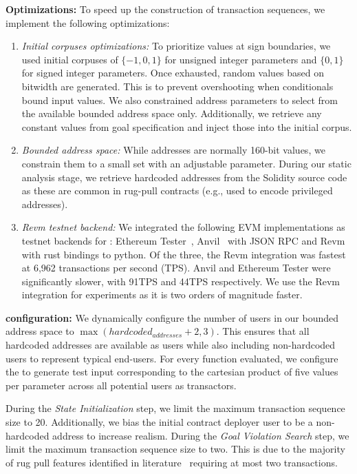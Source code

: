 \smallskip
\noindent
\textbf{Optimizations:} To speed up the construction of transaction sequences, we implement the following optimizations:
\begin{enumerate}
    \item \textit{Initial corpuses optimizations:}
        To prioritize values at sign boundaries, we used initial corpuses of $\{-1, 0, 1\}$ for unsigned integer parameters and $\{0, 1\}$ for signed integer parameters.
        Once exhausted, random values based on bitwidth are generated.
        This is to prevent overshooting when conditionals bound input values.
        We also constrained address parameters to select from the available bounded address space only.
        Additionally, we retrieve any constant values from goal specification and inject those into the initial corpus.
    \item \textit{Bounded address space:}
        While addresses are normally 160-bit values, we constrain them to a small set with an adjustable parameter.
        During our static analysis stage, we retrieve hardcoded addresses from the Solidity source code as these are common in rug-pull contracts (e.g., used to encode privileged addresses).
    \item \textit{Revm testnet backend:}
        We integrated the following EVM implementations as testnet backends for \spoilsport: Ethereum Tester~\cite{ethereum_tester}, Anvil~\cite{anvil} with JSON RPC and Revm~\cite{revm} with rust bindings to python.
        Of the three, the Revm integration was fastest at 6,962 transactions per second (TPS).
        Anvil and Ethereum Tester were significantly slower, with 91TPS and 44TPS respectively.
        We use the Revm integration for experiments as it is two orders of magnitude faster.
\end{enumerate}

\smallskip
\noindent
\textbf{\spoilsport configuration:}
We dynamically configure the number of users in our bounded address space to $\max{(hardcoded_{addresses} + 2, 3)}$.
This ensures that all hardcoded addresses are available as users while also including non-hardcoded users to represent typical end-users.
For every function evaluated,
we configure the  to generate test input corresponding to the cartesian product of five values per parameter across all potential users as transactors.

During the \textit{State Initialization} step, we limit the maximum transaction sequence size to 20.
Additionally, we bias the initial contract deployer user to be a non-hardcoded address to increase realism.
During the \textit{Goal Violation Search} step, we limit the maximum transaction sequence size to two.
This is due to the majority of rug pull features identified in literature~\cite{trapdoor,SoKRugPull2025,pied-piper} requiring at most two transactions.


